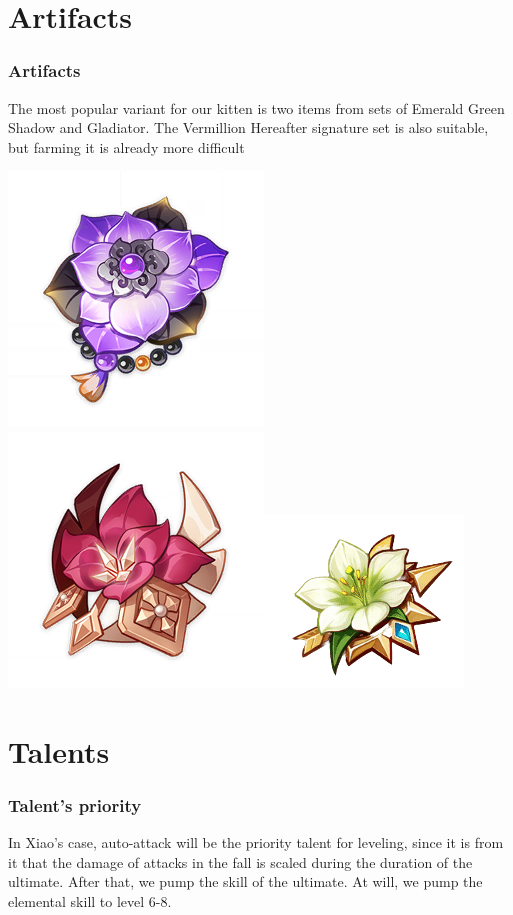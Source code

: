 \documentclass{beamer}
\begin{document}
\section{Artifacts} 
\begin{frame}
\frametitle{Artifacts}

The most popular variant for our kitten is two items from sets of Emerald Green Shadow and Gladiator. The Vermillion Hereafter signature set is also suitable, but farming it is already more difficult
\begin{center}
     \includegraphics[width=0.3\linewidth]{verm.png}\quad\includegraphics[width=.33\linewidth]{glad.png}\quad\includegraphics[width=.33\linewidth]{emerald.png}
          \end{center}
\end{frame}
\section{Talents}
\begin{frame}
\frametitle{Talent's priority} 
In Xiao's case, auto-attack will be the priority talent for leveling, since it is from it that the damage of attacks in the fall is scaled during the duration of the ultimate. After that, we pump the skill of the ultimate. At will, we pump the elemental skill to level 6-8.

\end{frame}
\end{document}
